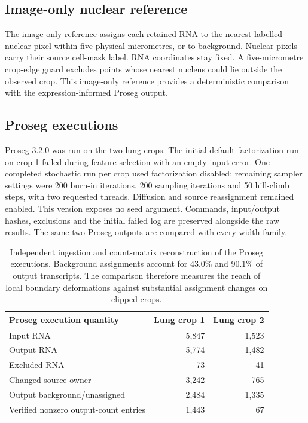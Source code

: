 \documentclass[10pt,letterpaper]{article}
\begin{document}
\subsection{Image-only nuclear reference}
The image-only reference assigns each retained RNA to the nearest labelled nuclear pixel within five physical micrometres, or to background. Nuclear pixels carry their source cell-mask label. RNA coordinates stay fixed. A five-micrometre crop-edge guard excludes points whose nearest nucleus could lie outside the observed crop. This image-only reference provides a deterministic comparison with the expression-informed Proseg output.

\FloatBarrier
\subsection{Proseg executions}
Proseg 3.2.0 was run on the two lung crops. The initial default-factorization run on crop 1 failed during feature selection with an empty-input error. One completed stochastic run per crop used factorization disabled; remaining sampler settings were 200 burn-in iterations, 200 sampling iterations and 50 hill-climb steps, with two requested threads. Diffusion and source reassignment remained enabled. This version exposes no seed argument. Commands, input/output hashes, exclusions and the initial failed log are preserved alongside the raw results. The same two Proseg outputs are compared with every width family.

\begin{table}[ht]\centering\begin{tabular}{lrr}\toprule
Proseg execution quantity&Lung crop 1&Lung crop 2\\\midrule
Input RNA&5,847&1,523\\
Output RNA&5,774&1,482\\
Excluded RNA&73&41\\
Changed source owner&3,242&765\\
Output background/unassigned&2,484&1,335\\
Verified nonzero output-count entries&1,443&67\\\bottomrule\end{tabular}
\caption{Independent ingestion and count-matrix reconstruction of the Proseg executions. Background assignments account for 43.0\% and 90.1\% of output transcripts. The comparison therefore measures the reach of local boundary deformations against substantial assignment changes on clipped crops.}
\end{table}
\end{document}
